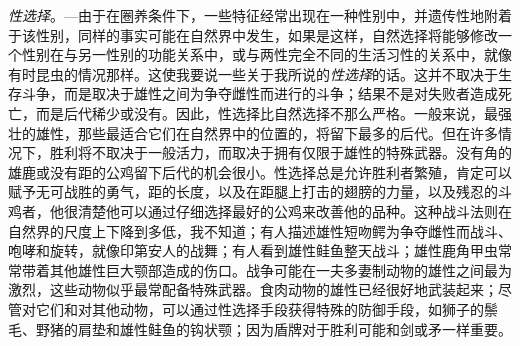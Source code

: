 \documentclass{article}
\begin{document}
\textit{性选择}。—由于在圈养条件下，一些特征经常出现在一种性别中，并遗传性地附着于该性别，同样的事实可能在自然界中发生，如果是这样，自然选择将能够修改一个性别在与另一性别的功能关系中，或与两性完全不同的生活习性的关系中，就像有时昆虫的情况那样。这使我要说一些关于我所说的\textit{性选择}的话。这并不取决于生存斗争，而是取决于雄性之间为争夺雌性而进行的斗争；结果不是对失败者造成死亡，而是后代稀少或没有。因此，性选择比自然选择不那么严格。一般来说，最强壮的雄性，那些最适合它们在自然界中的位置的，将留下最多的后代。但在许多情况下，胜利将不取决于一般活力，而取决于拥有仅限于雄性的特殊武器。没有角的雄鹿或没有距的公鸡留下后代的机会很小。性选择总是允许胜利者繁殖，肯定可以赋予无可战胜的勇气，距的长度，以及在距腿上打击的翅膀的力量，以及残忍的斗鸡者，他很清楚他可以通过仔细选择最好的公鸡来改善他的品种。这种战斗法则在自然界的尺度上下降到多低，我不知道；有人描述雄性短吻鳄为争夺雌性而战斗、咆哮和旋转，就像印第安人的战舞；有人看到雄性鲑鱼整天战斗；雄性鹿角甲虫常常带着其他雄性巨大颚部造成的伤口。战争可能在一夫多妻制动物的雄性之间最为激烈，这些动物似乎最常配备特殊武器。食肉动物的雄性已经很好地武装起来；尽管对它们和对其他动物，可以通过性选择手段获得特殊的防御手段，如狮子的鬃毛、野猪的肩垫和雄性鲑鱼的钩状颚；因为盾牌对于胜利可能和剑或矛一样重要。
\end{document}
